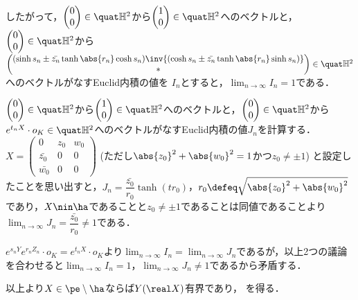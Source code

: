 \begin{npfwn}
  したがって，$
  \begin{pmatrix}
    0 \\ 0 
  \end{pmatrix}
  \in \quat\mathbb{H}^2 $から$
  \begin{pmatrix}
    1 \\ 0 
  \end{pmatrix}
  \in \quat\mathbb{H}^2 $へのベクトルと，$
  \begin{pmatrix}
    0 \\ 0 
  \end{pmatrix}
  \in \quat\mathbb{H}^2 $から\\
  $ \begin{pmatrix}
    (\sinh s_n \pm \bar{z_n} \tanh \abs{r_n} \cosh s_n)\inv{(\cosh s_n \pm \bar{z_n} \tanh \abs{r_n} \sinh s_n) } \\  \ast 
  \end{pmatrix}\in \quat\mathbb{H}^2 $へのベクトルがなすEuclid内積の値を $I_n$とすると，$\lim_{n\to \infty}I_n = 1 $である．

  $
  \begin{pmatrix}
    0 \\ 0 
  \end{pmatrix}
  \in \quat\mathbb{H}^2 $から$
  \begin{pmatrix}
    1 \\ 0
  \end{pmatrix}
  \in \quat\mathbb{H}^2 $へのベクトルと，$
  \begin{pmatrix}
    0 \\ 0 
  \end{pmatrix}
  \in \quat\mathbb{H}^2 $から$e^{t_nX}\cdot o_K \in \quat \mathbb{H}^2 $へのベクトルがなすEuclid内積の値$J_n$を計算する．$X =   \begin{pmatrix}
    0 & z_0 & w_0 \\
    \bar{z_0} & 0 & 0 \\
    \bar{w_0} & 0 & 0 
  \end{pmatrix}$ (ただし$\abs{z_0}^2 + \abs{w_0}^2 = 1 $かつ$z_0\neq \pm 1 $) と設定したことを思い出すと，$J_n = \dfrac{\bar{z_0}}{r_0}\tanh (tr_0) $，$r_0\defeq \sqrt{\abs{z_0}^2 + \abs{w_0}^2 } $であり，$X\nin \ha $であることと$z_0\neq \pm 1$であることは同値であることより$\lim_{n\to \infty}J_n = \dfrac{\bar{z_0}}{r_0}\neq 1 $である．

  $e^{s_n Y}e^{r_n Z_n}\cdot o_K = e^{t_n X}\cdot o_K$より$ \lim_{n\to \infty} I_n = \lim_{n\to \infty}J_n  $であるが，以上2つの議論を合わせると$\lim_{n\to \infty} I_n= 1$，$\lim_{n\to \infty}J_n \neq 1 $であるから矛盾する．
  

  以上より$X\in \pe\setminus\ha$ならば$Y(\real X) $有界であり， を得る．  
\end{npfwn}



